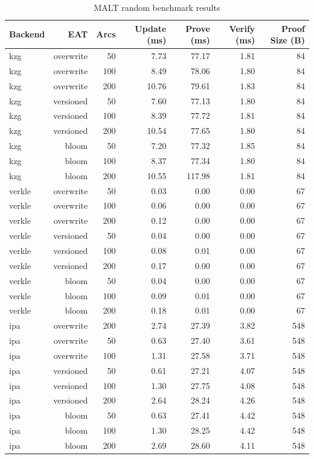 \begin{table}[htbp]
\centering
\caption{MALT random benchmark results}
\label{tab:random}
\begin{tabular}{lrrrrrr}
\toprule
Backend & EAT & Arcs & Update (ms) & Prove (ms) & Verify (ms) & Proof Size (B) \\
\midrule
kzg & overwrite & 50 & 7.73 & 77.17 & 1.81 & 84 \\
kzg & overwrite & 100 & 8.49 & 78.06 & 1.80 & 84 \\
kzg & overwrite & 200 & 10.76 & 79.61 & 1.83 & 84 \\
kzg & versioned & 50 & 7.60 & 77.13 & 1.80 & 84 \\
kzg & versioned & 100 & 8.39 & 77.72 & 1.81 & 84 \\
kzg & versioned & 200 & 10.54 & 77.65 & 1.80 & 84 \\
kzg & bloom & 50 & 7.20 & 77.32 & 1.85 & 84 \\
kzg & bloom & 100 & 8.37 & 77.34 & 1.80 & 84 \\
kzg & bloom & 200 & 10.55 & 117.98 & 1.81 & 84 \\
verkle & overwrite & 50 & 0.03 & 0.00 & 0.00 & 67 \\
verkle & overwrite & 100 & 0.06 & 0.00 & 0.00 & 67 \\
verkle & overwrite & 200 & 0.12 & 0.00 & 0.00 & 67 \\
verkle & versioned & 50 & 0.04 & 0.00 & 0.00 & 67 \\
verkle & versioned & 100 & 0.08 & 0.01 & 0.00 & 67 \\
verkle & versioned & 200 & 0.17 & 0.00 & 0.00 & 67 \\
verkle & bloom & 50 & 0.04 & 0.00 & 0.00 & 67 \\
verkle & bloom & 100 & 0.09 & 0.01 & 0.00 & 67 \\
verkle & bloom & 200 & 0.18 & 0.01 & 0.00 & 67 \\
ipa & overwrite & 200 & 2.74 & 27.39 & 3.82 & 548 \\
ipa & overwrite & 50 & 0.63 & 27.40 & 3.61 & 548 \\
ipa & overwrite & 100 & 1.31 & 27.58 & 3.71 & 548 \\
ipa & versioned & 50 & 0.61 & 27.21 & 4.07 & 548 \\
ipa & versioned & 100 & 1.30 & 27.75 & 4.08 & 548 \\
ipa & versioned & 200 & 2.64 & 28.24 & 4.26 & 548 \\
ipa & bloom & 50 & 0.63 & 27.41 & 4.42 & 548 \\
ipa & bloom & 100 & 1.30 & 28.25 & 4.42 & 548 \\
ipa & bloom & 200 & 2.69 & 28.60 & 4.11 & 548 \\
\bottomrule
\end{tabular}
\end{table}
